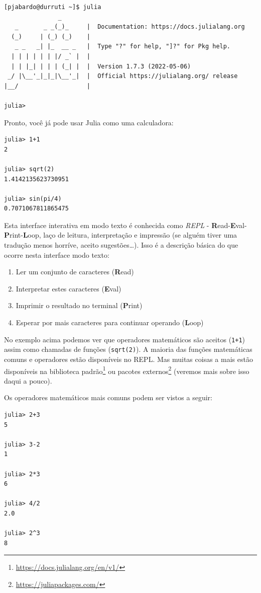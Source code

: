 \documentclass[
  notoc %
]{tufte-book}
\DeclareRobustCommand{\href}[2]{#2\footnote{\url{#1}}}
\providecommand{\tightlist}{%
  \setlength{\itemsep}{0pt}\setlength{\parskip}{0pt}
}
\newcommand{\passthrough}[1]{#1}
\begin{document}
\begin{lstlisting}
[pjabardo@durruti ~]$ julia
               _
   _       _ _(_)_     |  Documentation: https://docs.julialang.org
  (_)     | (_) (_)    |
   _ _   _| |_  __ _   |  Type "?" for help, "]?" for Pkg help.
  | | | | | | |/ _` |  |
  | | |_| | | | (_| |  |  Version 1.7.3 (2022-05-06)
 _/ |\__'_|_|_|\__'_|  |  Official https://julialang.org/ release
|__/                   |

julia> 
\end{lstlisting}

Pronto, você já pode usar Julia como uma calculadora:

\begin{lstlisting}
julia> 1+1
2

julia> sqrt(2)
1.4142135623730951

julia> sin(pi/4)
0.7071067811865475
\end{lstlisting}

Esta interface interativa em modo texto é conhecida como \emph{REPL} -
\textbf{R}ead-\textbf{E}val-\textbf{P}rint-\textbf{L}oop, laço de
leitura, interpretação e impressão (se alguém tiver uma tradução menos
horríve, aceito sugestões\ldots). Isso é a descrição básica do que
ocorre nesta interface modo texto:

\begin{enumerate}
\def\labelenumi{\arabic{enumi}.}
\tightlist
\item
  Ler um conjunto de caracteres (\textbf{R}ead)
\item
  Interpretar estes caracteres (\textbf{E}val)
\item
  Imprimir o resultado no terminal (\textbf{P}rint)
\item
  Esperar por mais caracteres para continuar operando (\textbf{L}oop)
\end{enumerate}

No exemplo acima podemos ver que operadores matemáticos são aceitos
(\passthrough{\lstinline!1+1!}) assim como chamadas de funções
(\passthrough{\lstinline!sqrt(2)!}). A maioria das funções matemáticas
comuns e operadores estão disponíveis no REPL. Mas muitas coisas a mais
estão disponíveis na \href{https://docs.julialang.org/en/v1/}{biblioteca
padrão} ou \href{https://juliapackages.com/}{pacotes externos} (veremos
mais sobre isso daqui a pouco).

Os operadores matemáticos mais comuns podem ser vistos a seguir:

\begin{lstlisting}
julia> 2+3
5

julia> 3-2
1

julia> 2*3
6

julia> 4/2
2.0

julia> 2^3
8
\end{lstlisting}
\end{document}
